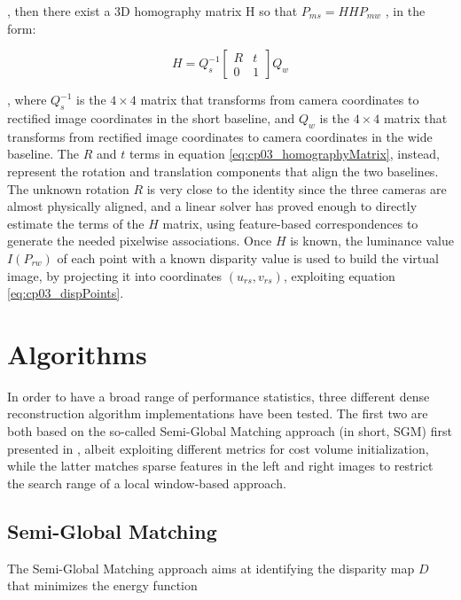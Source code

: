 , then there exist a 3D homography matrix H so that $P_{ms} = HHP_{mw}$ , in the form:

\begin{equation}\label{eq:cp03_homographyMatrix}
H = Q_s^{-1} \left[ \begin{array}{cc}
R & t \\
0 & 1 \end{array} \right] Q_w
\end{equation}

, where $Q_s^{-1}$ is the $4 \times 4$ matrix that transforms from camera coordinates to rectified image coordinates in the short baseline, and $Q_w$ is the $4 \times 4$ matrix that transforms from rectified image coordinates to camera coordinates in the wide baseline. The $R$ and $t$ terms in equation \ref{eq:cp03_homographyMatrix}, instead, represent the rotation and translation components that align the two baselines. The unknown rotation $R$ is very close to the identity since the three cameras are almost physically aligned, and a linear solver has proved enough to directly estimate the terms of the $H$ matrix, using feature-based correspondences to generate the needed pixelwise associations. Once $H$ is known, the luminance value $I(P_{rw})$ of each point with a known disparity value is used to build the virtual image, by projecting it into coordinates $(u_{rs} , v_{rs})$, exploiting equation \ref{eq:cp03_dispPoints}.

\section{Algorithms}\label{ch:chapter03_03}

In order to have a broad range of performance statistics, three different dense reconstruction algorithm implementations have been tested. The first two are both based on the so-called Semi-Global Matching approach (in short, SGM) first presented in \cite{Hirschmuller2005}, albeit exploiting different metrics for cost volume initialization, while the latter \citep{Geiger2011} matches sparse features in the left and right images to restrict the search range of a local window-based approach.

\subsection{Semi-Global Matching}\label{ch:chapter03_03_01}

The Semi-Global Matching approach aims at identifying the disparity map $D$ that minimizes the energy function

